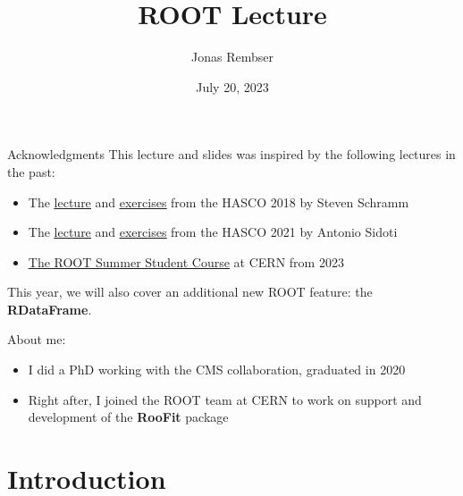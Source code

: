 \documentclass[aspectratio=169]{beamer}
\title[Your Short Title]{ROOT Lecture}
\author{Jonas Rembser}
\institute{CERN (EP-SFT)}
\date{July 20, 2023}
\newcommand{\myhref}[2]{{\color{blue}\href{#1}{\underline{#2}}}}
\begin{document}
\begin{frame}
    \titlepage
\end{frame}


\begin{frame}{Acknowledgments}
    This lecture and slides was inspired by the following lectures in the past:
    \vspace{3mm}
    \begin{itemize}
        \item The \myhref{https://indico.cern.ch/event/704163/contributions/2936717/attachments/1690757/2720489/StevenSchramm-IntroROOT.pdf}{lecture} and \myhref{https://indico.cern.ch/event/704163/contributions/2936719/attachments/1693833/2727086/Tutorial-ROOT.pdf}{exercises} from the HASCO 2018 by Steven Schramm
        \item The \myhref{https://indico.cern.ch/event/999261/contributions/4197218/attachments/2285603/3884654/hasco_root_2021.pdf}{lecture} and \myhref{https://indico.cern.ch/event/999261/contributions/4197219/attachments/2285604/3884655/hasco_root_tutorial_2021.pdf}{exercises} from the HASCO 2021 by Antonio Sidoti
        \item \myhref{https://github.com/root-project/training/tree/master/SummerStudentCourse/2023}{The ROOT Summer Student Course} at CERN from 2023
    \end{itemize}
    \vspace{3mm}
    This year, we will also cover an additional {\color{red}new ROOT feature}: the \textbf{RDataFrame}.

    \vspace{6mm}

    About me:
    \vspace{3mm}
    \begin{itemize}
    \item I did a PhD working with the CMS collaboration, graduated in 2020
    \item Right after, I joined the ROOT team at CERN to work on support and development of the \textbf{RooFit} package
    \end{itemize}
\end{frame}

\section{Introduction}
\end{document}
